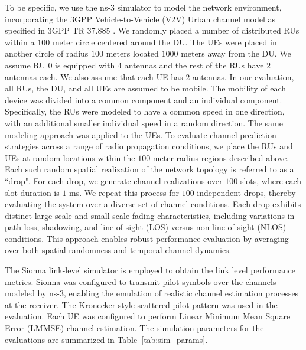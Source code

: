 \documentclass[lettersize,journal]{IEEEtran}
\begin{document}
To be specific, we use the ns-3 simulator to model the network environment, incorporating the 3GPP Vehicle-to-Vehicle (V2V) Urban channel model as specified in 3GPP TR 37.885 \cite{ns3_v2v}. 
We randomly placed a number of distributed RUs within a $100$ meter circle centered around the DU.
The UEs were placed in another circle of radius $100$ meters located $1000$ meters away from the DU.
We assume RU $0$ is equipped with $4$ antennas and the rest of the RUs have $2$ antennas each.
We also assume that each UE has $2$ antennas.
In our evaluation, all RUs, the DU, and all UEs are assumed to be mobile. 
The mobility of each device was divided into a common component and an individual component. 
Specifically, the RUs were modeled to have a common speed in one direction, with an additional smaller individual speed in a random direction. 
The same modeling approach was applied to the UEs.
To evaluate channel prediction strategies across a range of radio propagation conditions, we place the RUs and UEs at random locations within the $100$ meter radius regions described above. 
Each such random spatial realization of the network topology is referred to as a ``drop". 
For each drop, we generate channel realizations over $100$ slots, where each slot duration is $1$ ms. 
We repeat this process for $100$ independent drops, thereby evaluating the system over a diverse set of channel conditions.
Each drop exhibits distinct large-scale and small-scale fading characteristics, including variations in path loss, shadowing, and line-of-sight (LOS) versus non-line-of-sight (NLOS) conditions.
This approach enables robust performance evaluation by averaging over both spatial randomness and temporal channel dynamics.


The Sionna link-level simulator \cite{sionna} is employed to obtain the link level performance metrics. 
Sionna was configured to transmit pilot symbols over the channels modeled by ns-3, enabling the emulation of realistic channel estimation processes at the receiver. 
The Kronecker-style scattered pilot pattern was used in the evaluation.
Each UE was configured to perform Linear Minimum Mean Square Error (LMMSE) channel estimation. The simulation parameters for the evaluations are summarized in Table~\ref{tab:sim_params}.
\end{document}
